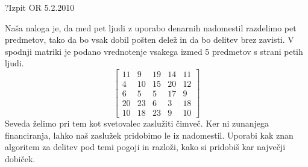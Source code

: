 \begin{naloga}{?}{Izpit OR 5.2.2010}
\begin{vprasanje}
Naša naloga je,
da med pet ljudi z uporabo denarnih nadomestil razdelimo pet predmetov,
tako da bo vsak dobil pošten delež in da bo delitev brez zavisti.
V spodnji matriki je podano vrednotenje vsakega izmed 5 predmetov
s strani petih ljudi.
$$
\begin{bmatrix}
11 &  9 & 19 & 14 & 11 \\
 4 & 10 & 15 & 20 & 12 \\
 6 &  5 &  5 & 17 & 9  \\
20 & 23 &  6 &  3 & 18 \\
10 & 18 & 23 &  9 & 10
\end{bmatrix}
$$
Seveda želimo pri tem kot svetovalec zaslužiti čimveč.
Ker ni zunanjega financiranja, lahko naš zaslužek pridobimo le iz nadomestil.
Uporabi kak znan algoritem za delitev pod temi pogoji in razloži,
kako si pridobiš kar največji dobiček.
\end{vprasanje}
\begin{odgovor}
\end{odgovor}
\end{naloga}
